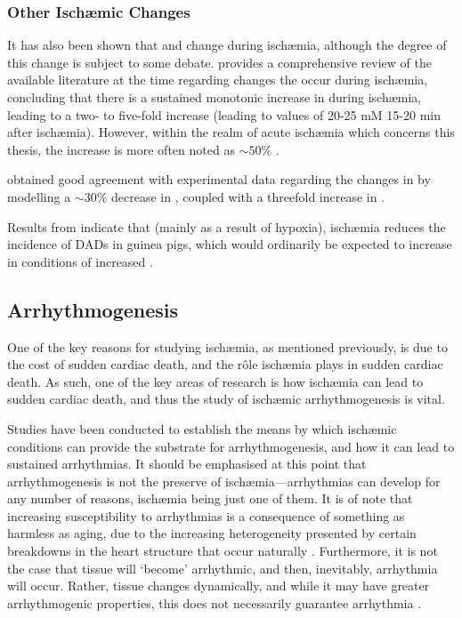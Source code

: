 \documentclass[../thesis-main.tex]{subfiles}
\begin{document}
\subsubsection{Other Isch\ae{}mic Changes}
\label{subsubsec:isch-other}
It has also been shown that \nai{} and \nao{} change during isch\ae{}mia, although the degree of this change is subject to some debate. \citet{Carmeliet1999} provides a comprehensive review of the available literature at the time regarding changes the occur during isch\ae{}mia, concluding that there is a sustained monotonic increase in \nai{} during isch\ae{}mia, leading to a two- to five-fold increase (leading to values of 20-25 mM 15-20 min after isch\ae{}mia). However, within the realm of acute isch\ae{}mia which concerns this thesis, the increase is more often noted as $\sim50\%$ \citep{Malloy1990, Pike1993, VanEchteld1991, Tani1989}.

\citet{Noble2002} obtained good agreement with experimental data regarding the changes in \cai{} by modelling a $\sim30\%$ decrease in \nao{}, coupled with a threefold increase in \nai{}.

Results from \citet{Coetzee1987} indicate that (mainly as a result of hypoxia), isch\ae{}mia reduces the incidence of DADs in guinea pigs, which would ordinarily be expected to increase in conditions of increased \cai{}.


\subsection{Arrhythmogenesis}
\label{subsec:arrhythmogenesis}
One of the key reasons for studying isch\ae{}mia, as mentioned previously, is due to the cost of sudden cardiac death, and the r\^ole isch\ae{}mia plays in sudden cardiac death. As such, one of the key areas of research is how isch\ae{}mia can lead to sudden cardiac death, and thus the study of isch\ae{}mic arrhythmogenesis is vital.

Studies have been conducted to establish the means by which isch\ae{}mic conditions can provide the substrate for arrhythmogenesis, and how it can lead to sustained arrhythmias. It should be emphasised at this point that arrhythmogenesis is not the preserve of isch\ae{}mia---arrhythmias can develop for any number of reasons, isch\ae{}mia being just one of them. It is of note that increasing susceptibility to arrhythmias is a consequence of something as harmless as aging, due to the increasing heterogeneity presented by certain breakdowns in the heart structure that occur naturally \citep{Spach1988}. Furthermore, it is not the case that tissue will `become' arrhythmic, and then, inevitably, arrhythmia will occur. Rather, tissue changes dynamically, and while it may have greater arrhythmogenic properties, this does not necessarily guarantee arrhythmia \citep{Weiss2006}.
\end{document}
